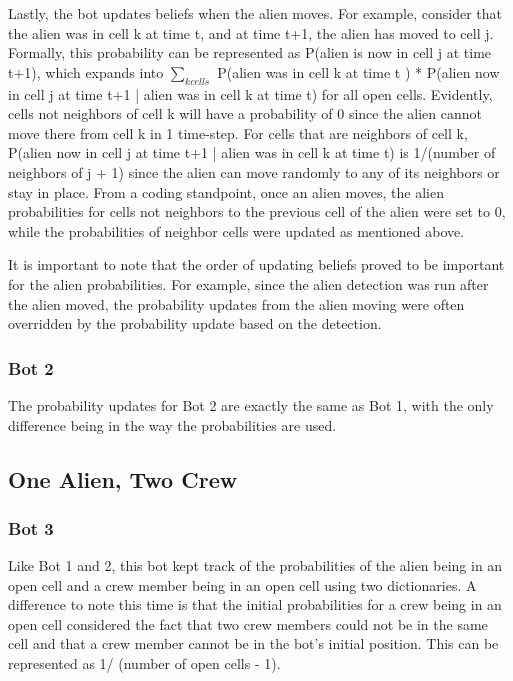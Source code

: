 \documentclass[11pt]{article}
\begin{document}
\medskip

Lastly, the bot updates beliefs when the alien moves. For example, consider that the alien was in cell k at time t, and at time t+1, the alien has moved to cell j. Formally, this probability can be represented as P(alien is now in cell j at time t+1), which expands into $\sum_{k cells}$ P(alien was in cell k at time t ) * P(alien now in cell j at time t+1 | alien was in cell k at time t) for all open cells. Evidently, cells not neighbors of cell k will have a probability of 0 since the alien cannot move there from cell k in 1 time-step. For cells that are neighbors of cell k, P(alien now in cell j at time t+1 | alien was in cell k at time t) is 1/(number of neighbors of j + 1) since the alien can move randomly to any of its neighbors or stay in place. From a coding standpoint, once an alien moves, the alien probabilities for cells not neighbors to the previous cell of the alien were set to 0, while the probabilities of neighbor cells were updated as mentioned above. 

\medskip

It is important to note that the order of updating beliefs proved to be important for the alien probabilities. For example, since the alien detection was run after the alien moved, the probability updates from the alien moving were often overridden by the probability update based on the detection. 

\subsubsection{Bot 2}

The probability updates for Bot 2 are exactly the same as Bot 1, with the only difference being in the way the probabilities are used.

\subsection{One Alien, Two Crew}

\subsubsection{Bot 3}
Like Bot 1 and 2, this bot kept track of the probabilities of the alien being in an open cell and a crew member being in an open cell using two dictionaries. A difference to note this time is that the initial probabilities for a crew being in an open cell considered the fact that two crew members could not be in the same cell and that a crew member cannot be in the bot's initial position. This can be represented as 1/ (number of open cells - 1). 
\end{document}
